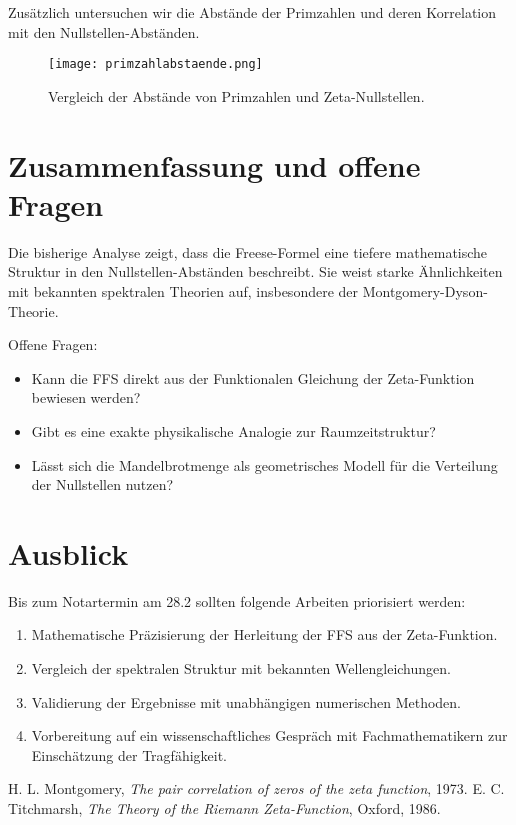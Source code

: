 \documentclass[a4paper,12pt]{article}
\begin{document}
Zusätzlich untersuchen wir die Abstände der Primzahlen und deren Korrelation mit den Nullstellen-Abständen. 

\begin{figure}[h]
    \centering
    \texttt{[image: primzahlabstaende.png]}
    \caption{Vergleich der Abstände von Primzahlen und Zeta-Nullstellen.}
    \label{fig:primzahlen}
\end{figure}

\section{Zusammenfassung und offene Fragen}
Die bisherige Analyse zeigt, dass die Freese-Formel eine tiefere mathematische Struktur in den Nullstellen-Abständen beschreibt. Sie weist starke Ähnlichkeiten mit bekannten spektralen Theorien auf, insbesondere der Montgomery-Dyson-Theorie.

Offene Fragen:
\begin{itemize}
    \item Kann die FFS direkt aus der Funktionalen Gleichung der Zeta-Funktion bewiesen werden?
    \item Gibt es eine exakte physikalische Analogie zur Raumzeitstruktur?
    \item Lässt sich die Mandelbrotmenge als geometrisches Modell für die Verteilung der Nullstellen nutzen?
\end{itemize}

\section{Ausblick}
Bis zum Notartermin am 28.2 sollten folgende Arbeiten priorisiert werden:
\begin{enumerate}
    \item Mathematische Präzisierung der Herleitung der FFS aus der Zeta-Funktion.
    \item Vergleich der spektralen Struktur mit bekannten Wellengleichungen.
    \item Validierung der Ergebnisse mit unabhängigen numerischen Methoden.
    \item Vorbereitung auf ein wissenschaftliches Gespräch mit Fachmathematikern zur Einschätzung der Tragfähigkeit.
\end{enumerate}

\begin{thebibliography}{9}
H. L. Montgomery, \textit{The pair correlation of zeros of the zeta function}, 1973.
E. C. Titchmarsh, \textit{The Theory of the Riemann Zeta-Function}, Oxford, 1986.
\end{thebibliography}
\end{document}
